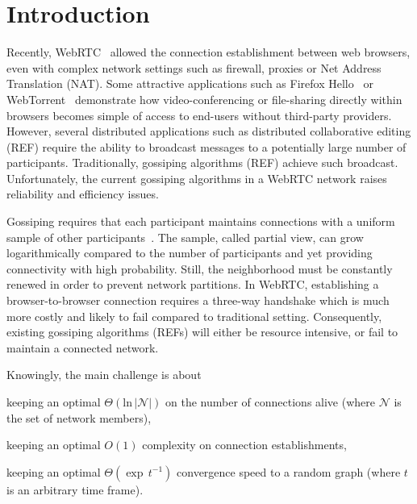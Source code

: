 
\section{Introduction}

Recently, WebRTC~\cite{webrtc} allowed the connection establishment between
web browsers, even with complex network settings such as firewall, proxies or
Net Address Translation (NAT).  Some attractive applications such as Firefox
Hello~\cite{firefoxhello} or WebTorrent~\cite{webtorrent} demonstrate how
video-conferencing or file-sharing directly within browsers becomes simple of
access to end-users without third-party providers. However, several distributed
applications such as distributed collaborative editing (REF) require the
ability to broadcast messages to a potentially large number of
participants. Traditionally, gossiping algorithms (REF) achieve such
broadcast. Unfortunately, the current gossiping algorithms in a WebRTC network
raises reliability and efficiency issues.

Gossiping requires that each participant maintains connections with a uniform
sample of other participants~\cite{jelasity2004peer}. The sample, called
partial view, can grow logarithmically compared to the number of participants
and yet providing connectivity with high probability. Still, the neighborhood
must be constantly renewed in order to prevent network partitions. In WebRTC,
establishing a browser-to-browser connection requires a three-way handshake
which is much more costly and likely to fail compared to traditional
setting. Consequently, existing gossiping algorithms (REFs) will either be
resource intensive, or fail to maintain a connected network.

Knowingly, the main challenge is about
\begin{inparaenum}[(i)]
\item keeping an optimal $\Theta(\text{ln}\, |\mathcal{N}|)$ on the number of
    connections alive\cite{erdos1959random} (where $\mathcal{N}$ is the set of network members),
\item keeping an optimal $O(1)$ complexity on connection establishments,
\item keeping an optimal $\Theta(\exp \, t^{-1})$ convergence speed to a random
  graph (where $t$ is an arbitrary time frame).
\end{inparaenum}

